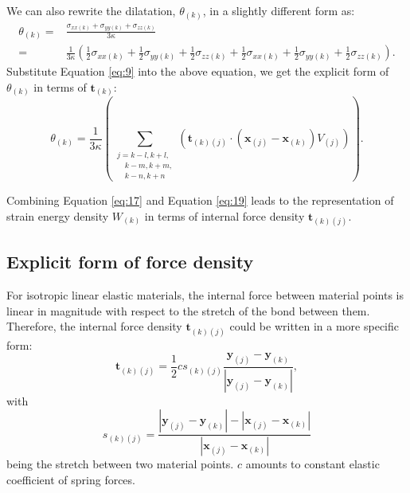 \documentclass[11pt,fullpage]{article}
\newcommand{\mb}[1]{\mathbf{#1}}
\newcommand{\blue}[1]{#1}
\begin{document}
We can also rewrite the dilatation, $\theta_{(k)}$, in a slightly different form as:
\begin{equation}
\begin{aligned}
\theta_{(k)} =& \frac{\sigma_{xx(k)}+\sigma_{yy(k)}+\sigma_{zz(k)}}{3\kappa}\\
        =& \frac{1}{3\kappa}(\frac{1}{2}\sigma_{xx(k)}+\frac{1}{2}\sigma_{yy(k)}+\frac{1}{2}\sigma_{zz(k)}
         + \frac{1}{2}\sigma_{xx(k)}+\frac{1}{2}\sigma_{yy(k)}+\frac{1}{2}\sigma_{zz(k)}).
\end{aligned}
\label{eq:18}
\end{equation}
Substitute Equation \blue{\ref{eq:9}} into the above equation, we get the explicit form of $\theta_{(k)}$ in terms of $\mb{t}_{(k)}$:
\begin{equation}
\theta_{(k)} = \frac{1}{3\kappa}\left(\sum_{\substack {j=k-l,k+l,\\ \quad k-m,k+m,\\ \quad k-n,k+n}}(\mb{t}_{(k)(j)}\cdot(\mb{x}_{(j)}-\mb{x}_{(k)})V_{(j)})\right).
\label{eq:19}
\end{equation}

Combining Equation \blue{\ref{eq:17}} and Equation \blue{\ref{eq:19}} leads to the representation of strain energy density $W_{(k)}$ in terms of internal force density $\mb{t}_{(k)(j)}$.

\subsection{Explicit form of force density}

For isotropic linear elastic materials, the internal force between material points is linear in magnitude with respect to the stretch of the bond between them. Therefore, the internal force density $\mb{t}_{(k)(j)}$ could be written in a more specific form:
\begin{equation}
\mb{t}_{(k)(j)} = \frac{1}{2}cs_{(k)(j)}\frac{\mb{y}_{(j)} - \mb{y}_{(k)}}{|\mb{y}_{(j)} - \mb{y}_{(k)}|},
\label{eq:20}
\end{equation}
with
\begin{equation}
s_{(k)(j)} = \frac{|\mb{y}_{(j)} - \mb{y}_{(k)}| - |\mb{x}_{(j)} - \mb{x}_{(k)}|}{|\mb{x}_{(j)} - \mb{x}_{(k)}|}
\label{eq:21}
\end{equation}
being the stretch between two material points. $c$ amounts to constant elastic coefficient of spring forces.
\end{document}
